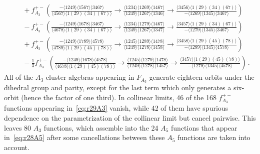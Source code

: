 \documentclass[11pt]{article}
\begin{document}
\begin{align}
&\quad+ f_{A_3}^{+-} \left( \tfrac{ - \langle 1249 \rangle \langle 1567 \rangle \langle 3467 \rangle}{\langle 4567 \rangle \langle 1(29)(34)(67) \rangle} \! 
    \to \! \tfrac{\langle 1234 \rangle \langle 1269 \rangle \langle 1467 \rangle}{\langle 1249 \rangle \langle 1267 \rangle \langle 1346 \rangle} \! 
    \to \! \tfrac{\langle 3456 \rangle  \langle 1(29)(34)(67) \rangle}{ - \langle 1269 \rangle \langle 1345 \rangle \langle 3467 \rangle} \right) \nonumber \\
&\quad- f_{A_3}^{+-} \left( \tfrac{ - \langle 1249 \rangle \langle 1678 \rangle \langle 3467 \rangle}{\langle 4678 \rangle \langle 1(29)(34)(67) \rangle} \! 
    \to \! \tfrac{\langle 1234 \rangle \langle 1279 \rangle \langle 1467 \rangle}{\langle 1249 \rangle \langle 1267 \rangle \langle 1347 \rangle} \! 
    \to \! \tfrac{\langle 3457 \rangle \langle 1(29)(34)(67) \rangle}{ - \langle 1279 \rangle \langle 1345 \rangle \langle 3467 \rangle} \right) \nonumber \\
&\quad+ f_{A_3}^{+-} \left( \tfrac{ - \langle 1249 \rangle \langle 1789 \rangle \langle 4578 \rangle}{\langle 4789 \rangle \langle 1(29)(45)(78) \rangle} \! 
    \to \! \tfrac{\langle 1245 \rangle \langle 1289 \rangle \langle 1478 \rangle}{\langle 1249 \rangle \langle 1278 \rangle \langle 1458 \rangle } \! 
    \to \! \tfrac{\langle 3458 \rangle \langle 1(29)(45)(78) \rangle}{ - \langle 1289 \rangle \langle 1345 \rangle \langle 4578 \rangle} \right) \nonumber \\
&\quad- \tfrac{1}{3} f_{A_3}^{+-} \left( \tfrac{ - \langle 1249 \rangle \langle 1678 \rangle \langle 4578 \rangle}{\langle 4678 \rangle \langle 1(29)(45)(78) \rangle} \! 
    \to \! \tfrac{\langle 1245 \rangle \langle 1279 \rangle \langle 1478 \rangle}{\langle 1249 \rangle \langle 1278 \rangle \langle 1457 \rangle} \! 
    \to \! \tfrac{\langle 3457 \rangle \langle 1(29)(45)(78) \rangle}{ - \langle 1279 \rangle \langle 1345 \rangle \langle 4578 \rangle} \right) \, . \nonumber 
\end{align}
All of the $A_3$ cluster algebras appearing in $F_{A_3}$ generate eighteen-orbits under the dihedral group and parity, except for the last term which only generates a six-orbit (hence the factor of one third). In collinear limits, 46 of the 168 $f_{A_3}^{+-}$ functions appearing in~\eqref{eq:r29A3} vanish, while 42 of them have spurious dependence on the parametrization of the collinear limit but cancel pairwise. This leaves 80 $A_3$ functions, which assemble into the 24 $A_5$ functions that appear in~\eqref{eq:r28A5} after some cancellations between these $A_5$ functions are taken into account. 
\end{document}
